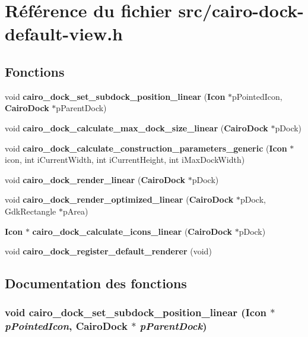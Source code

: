 \section{Référence du fichier src/cairo-dock-default-view.h}
\label{cairo-dock-default-view_8h}
\subsection*{Fonctions}
\begin{CompactItemize}
\item 
void {\bf cairo\_\-dock\_\-set\_\-subdock\_\-position\_\-linear} ({\bf Icon} $\ast$pPointedIcon, {\bf CairoDock} $\ast$pParentDock)
\item 
void {\bf cairo\_\-dock\_\-calculate\_\-max\_\-dock\_\-size\_\-linear} ({\bf CairoDock} $\ast$pDock)
\item 
void {\bf cairo\_\-dock\_\-calculate\_\-construction\_\-parameters\_\-generic} ({\bf Icon} $\ast$icon, int iCurrentWidth, int iCurrentHeight, int iMaxDockWidth)
\item 
void {\bf cairo\_\-dock\_\-render\_\-linear} ({\bf CairoDock} $\ast$pDock)
\item 
void {\bf cairo\_\-dock\_\-render\_\-optimized\_\-linear} ({\bf CairoDock} $\ast$pDock, GdkRectangle $\ast$pArea)
\item 
{\bf Icon} $\ast$ {\bf cairo\_\-dock\_\-calculate\_\-icons\_\-linear} ({\bf CairoDock} $\ast$pDock)
\item 
void {\bf cairo\_\-dock\_\-register\_\-default\_\-renderer} (void)
\end{CompactItemize}


\subsection{Documentation des fonctions}
\subsubsection{\setlength{\rightskip}{0pt plus 5cm}void cairo\_\-dock\_\-set\_\-subdock\_\-position\_\-linear ({\bf Icon} $\ast$ {\em pPointedIcon}, {\bf CairoDock} $\ast$ {\em pParentDock})}\label{cairo-dock-default-view_8h_674e4028e3f428bbd517d6d4b3151e96}


